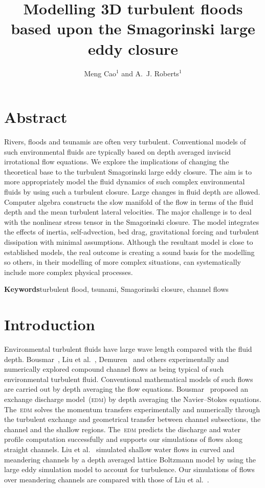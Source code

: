 \documentclass[a5paper,12pt]{article}
\title{Modelling 3D turbulent floods based upon the Smagorinski large eddy closure}
\author{Meng Cao$^1$ and A.~J. Roberts$^1$}
\affiliation{$^1$School of Mathematical Sciences\\
                University of Adelaide, South Australia 5005, Australia\\[5pt]
            }
\begin{document}
    
\maketitle

\section{Abstract}
Rivers, floods and tsunamis are often very turbulent.
Conventional models of such environmental fluids are typically based on depth averaged inviscid irrotational flow equations.
We explore the implications of changing the theoretical base to the turbulent Smagorinski large eddy closure.
The aim is to more appropriately model the fluid dynamics of such complex environmental fluids by using such a turbulent closure.
Large changes in fluid depth are allowed.
Computer algebra constructs the slow manifold of the flow in terms of the fluid depth and the mean turbulent lateral velocities.
The major challenge is to deal with the nonlinear stress tensor in the Smagorinski closure.
The model integrates the effects of inertia, self-advection, bed drag, gravitational forcing and turbulent dissipation with minimal assumptions.
Although the resultant model is close to established models, the real outcome is creating a sound basis for the modelling so others, in their modelling of more complex situations, can systematically include more complex physical processes.

\textbf{Keywords}\quad turbulent flood, tsunami, Smagorinski closure, channel flows

\section{Introduction}

Environmental turbulent fluids have large wave length compared with the fluid depth.
Bousmar~\cite{Bousmar2002}, Liu et al.~\cite{Liu2009}, Demuren~\cite{Demuren1993} and others experimentally and numerically explored compound channel flows as being typical of such environmental turbulent fluid.
Conventional mathematical models of such flows are carried out by depth averaging the flow equations. 
Bousmar~\cite{Bousmar2002} proposed an exchange discharge model~(\textsc{edm}) by depth averaging the Navier--Stokes equations.
The~\textsc{edm} solves the momentum transfers experimentally and numerically through the turbulent exchange and geometrical transfer between channel subsections, the channel and the shallow regions.
The~\textsc{edm} predicts the discharge and water profile computation successfully and supports our simulations of flows along straight channels. 
Liu et al.~\cite{Liu2009} simulated shallow water flows in curved and meandering channels by a depth averaged lattice Boltzmann model by using the large eddy simulation model to account for turbulence.
Our simulations of flows over meandering channels are compared with those of Liu et al.~\cite{Liu2009}. 
\end{document}
